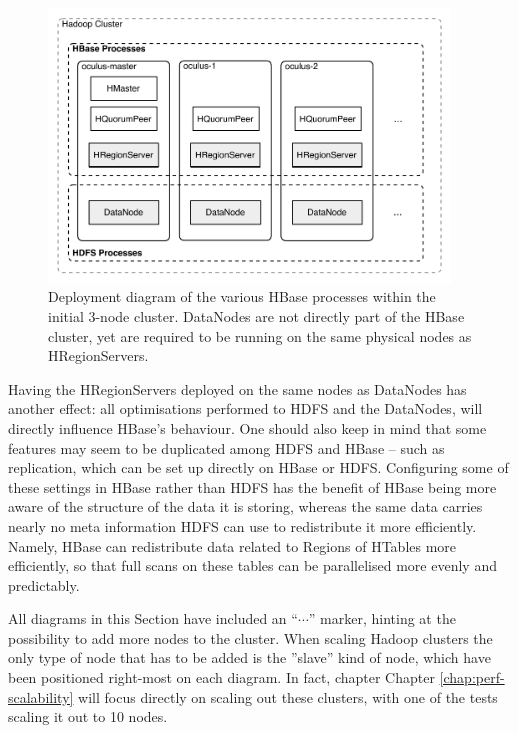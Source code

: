 \begin{figure}[ch!]
  \centering
  \includegraphics[width=0.95\textwidth]{img/hbase-processes}
  \caption{Deployment diagram of the various HBase processes within the initial 3-node cluster. DataNodes are not directly part of the HBase cluster, yet are required to be running on the same physical nodes as HRegionServers.}
  \label{fig:small-cluster-deployment}
\end{figure}

Having the HRegionServers deployed on the same nodes as DataNodes has another effect: all optimisations performed to HDFS and the DataNodes, will directly influence HBase's behaviour. One should also keep in mind that some features may seem to be duplicated among HDFS and HBase -- such as replication, which can be set up directly on HBase or HDFS. Configuring some of these settings in HBase rather than HDFS has the benefit of HBase being more aware of the structure of the data it is storing, whereas the same data carries nearly no meta information HDFS can use to redistribute it more efficiently. 
Namely, HBase can redistribute data related to Regions of HTables more efficiently, so that full scans on these tables can be parallelised more evenly and predictably.

All diagrams in this Section have included an ``$\cdots$'' marker, hinting at the possibility to add more nodes to the cluster. When scaling Hadoop clusters the only type of node that has to be added is the ''slave'' kind of node, which have been positioned right-most on each diagram. In fact, chapter Chapter \ref{chap:perf-scalability} will focus directly on scaling out these clusters, with one of the tests scaling it out to 10 nodes.

